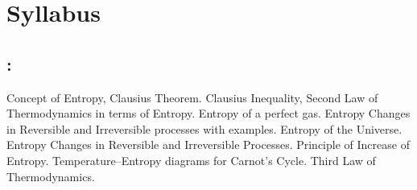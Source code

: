 \section*{Syllabus}

    \subsection*{\topicSubTitle: \topicTitle}
        Concept of Entropy, Clausius Theorem. Clausius Inequality, Second Law of Thermodynamics in terms of Entropy. Entropy of a perfect gas. Entropy Changes in Reversible and Irreversible processes with examples. Entropy of the Universe. Entropy Changes in Reversible and Irreversible Processes. Principle of Increase of Entropy. Temperature–Entropy diagrams for Carnot’s Cycle. Third Law of Thermodynamics.